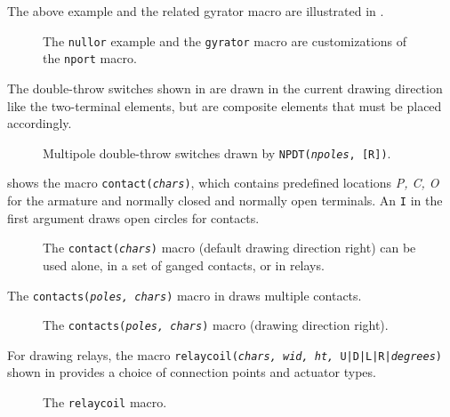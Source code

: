 The above example and the related gyrator macro are illustrated in
. 
\begin{figure}[h!t]
   
   \caption{The {\tt nullor} example and the {\tt gyrator}
    macro are customizations of the {\tt nport} macro.}
   \label{NLG}
   \end{figure}

The double-throw switches shown in  are drawn in the
current drawing direction like the two-terminal elements, but are
composite elements that must be placed accordingly.
\begin{figure}[h!t]
   
   \caption{Multipole double-throw switches drawn by
    {\tt NPDT({\sl npoles}, [R])}.}
   \label{NPDT}
   \end{figure}

 shows the macro {\tt contact({\sl chars})},
which contains predefined locations {\sl P, C, O}
for the armature and normally closed and normally
open terminals.
An {\tt I} in the first argument draws open circles for contacts.
\begin{figure}[h!t]
   
   \vspace{-1ex}
   \caption{The {\tt contact({\sl chars})}
     macro (default drawing direction right)
     can be used alone, in a set of ganged contacts, or in relays.}
   \label{Contact}
   \end{figure}

\pagebreak
The {\tt contacts({\sl poles, chars})} macro in 
draws multiple contacts.
\begin{figure}[h!t]
   
   \vspace{-1ex}
   \caption{The {\tt contacts({\sl poles, chars})}
     macro (drawing direction right).}
   \label{Contacts}
   \end{figure}

For drawing relays, the macro
 {\tt relaycoil({\sl chars, wid, ht,} {\tt U|D|L|R|}{\sl degrees})}
shown in  provides a choice of connection points and
actuator types. 
\begin{figure}[h!t]
   
   \vspace{-1ex}
   \caption{The {\tt relaycoil} macro.}
   \label{relaycoil}
   \end{figure}

